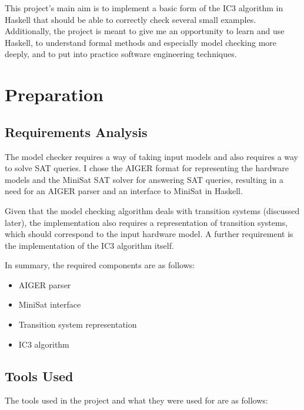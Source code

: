 \documentclass[12pt,a4paper,twoside,openright]{report}
\begin{document}
This project's main aim is to implement a basic form of the IC3 algorithm in
Haskell that should be able to correctly check several
small examples. Additionally, the project is meant to give me an opportunity
to learn and use Haskell, to understand formal methods and especially model
checking more deeply, and to put into practice software engineering techniques.

\chapter{Preparation}

\section{Requirements Analysis}


The model checker requires a way of taking input models and also
requires a way to solve SAT queries.
I chose the AIGER format for representing the hardware models and the
MiniSat SAT solver for answering SAT queries, resulting in a need for an
AIGER parser and an interface to MiniSat in Haskell.

Given that the model checking algorithm deals with transition systems
(discussed later), the implementation also requires a representation of
transition systems, which should correspond to the input hardware model.
A further requirement is the implementation of the
IC3 algorithm itself.

In summary, the required components are as follows:
\begin{itemize}
\item AIGER parser
\item MiniSat interface
\item Transition system representation
\item IC3 algorithm
\end{itemize}

\section{Tools Used}

The tools used in the project and what they were used for are as follows:
\end{document}
